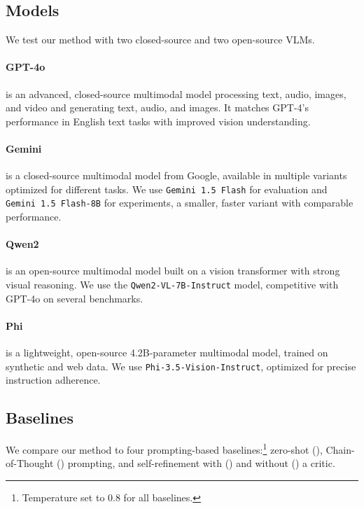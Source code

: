 \subsection{Models}
\label{sec:exp_setup_models}

We test our method with two closed-source and two open-source VLMs.
\paragraph{GPT-4o \cite{hurst2024gpt}} is an advanced, closed-source multimodal model processing text, audio, images, and video and generating text, audio, and images. It matches GPT-4's performance in English text tasks with improved vision understanding.
\paragraph{Gemini \cite{team2023gemini}} is a closed-source multimodal model from Google, available in multiple variants optimized for different tasks. 
We use \texttt{Gemini 1.5 Flash} for evaluation and \texttt{Gemini 1.5 Flash-8B} for experiments, a smaller, faster variant with comparable performance.
\paragraph{Qwen2 \cite{yang2024qwen2technicalreport}} is an open-source multimodal model built on a vision transformer with strong visual reasoning. We use the \texttt{Qwen2-VL-7B-Instruct} model, competitive with GPT-4o on several benchmarks.
\paragraph{Phi \cite{phi}} is a lightweight, open-source 4.2B-parameter multimodal model, trained on synthetic and web data. We use \texttt{Phi-3.5-Vision-Instruct}, optimized for precise instruction adherence.

\subsection{Baselines}
\label{sec:exp_setup:baselines}

We compare our method to four prompting-based baselines:\footnote{Temperature set to 0.8 for all baselines.} zero-shot (\base{}), Chain-of-Thought (\chain{}) prompting, and self-refinement with (\critic{}) and without (\nocritic{}) a critic.

